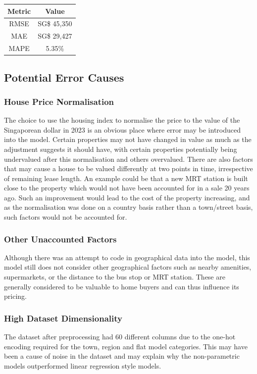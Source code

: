 \documentclass[[12pt,conference]{IEEEtran}
\begin{document}
\begin{table}[H]
\label{tab:evaluation}
\centering
\begin{tabular}{c|c}
Metric & Value \\\hline
RMSE & SG\$ 45,350 \\
MAE &  SG\$ 29,427 \\
MAPE & 5.35\%
\end{tabular}
\end{table}




\subsection{Potential Error Causes}

\subsubsection{House Price Normalisation}
The choice to use the housing index to normalise the price to the value of the Singaporean dollar in 2023 is an obvious place where error may be introduced into the model.
Certain properties may not have changed in value as much as the adjustment suggests it should have, with certain properties potentially being undervalued after this normalisation and others overvalued. 
There are also factors that may cause a house to be valued differently at two points in time, irrespective of remaining lease length. An example could be that a new MRT station is built close to the property which would not have been accounted for in a sale 20 years ago. 
Such an improvement would lead to the cost of the property increasing, and as the normalisation was done on a country basis rather than a town/street basis, such factors would not be accounted for. 

\subsubsection{Other Unaccounted Factors}
Although there was an attempt to code in geographical data into the model, this model still does not consider other geographical factors such as nearby amenities, supermarkets, or the distance to the bus stop or MRT station. These are generally considered to be valuable to home buyers and can thus influence its pricing.

\subsubsection{High Dataset Dimensionality}
The dataset after preprocessing had 60 different columns due to the one-hot encoding required for the town, region and flat model categories. This may have been a cause of noise in the dataset and may explain why the non-parametric models outperformed linear regression style models. 
\end{document}
